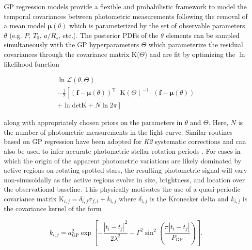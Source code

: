 GP regression models provide a flexible and probabilistic framework to model the temporal
covariances between photometric measurements following the removal of a mean model
$\boldsymbol{\mu}(\theta)$ which is parameterized by the set of observable parameters $\theta$
(e.g. $P$, $T_0$, $a/R_s$, etc.). The posterior PDFs of the $\theta$ elements 
can be sampled simultaneously with the GP hyperparameters $\Theta$ which parameterize
the residual covariances through the covariance matrix K($\Theta$) and are fit by
optimizing the $\ln$ likelihood function

\begin{multline}
  \ln{\mathcal{L}(\theta,\Theta)} = \\
  -\frac{1}{2} \left[ (\mathbf{f}-\boldsymbol{\mu}(\theta))^{\text{T}}
    \cdot \text{K}(\Theta)^{-1} \cdot (\mathbf{f}-\boldsymbol{\mu}(\theta)) \right. \\
    \left. + \ln{\mathrm{det} \text{K}} + N \ln{2 \pi} \right] \label{eq:lnL}
\end{multline}

\noindent along with appropriately chosen priors on the parameters in $\theta$ and $\Theta$.
Here, $N$ is the number of photometric measurements in the light curve. Similar routines based on GP regression 
have been adopted for \emph{K2} systematic corrections \citep[e.g.][]{aigrain15,crossfield15,aigrain16} 
and can also be used to infer accurate photometric stellar rotation periods \citep{angus18}. For cases in which
the origin of the apparent photometric variations are likely dominated by active regions on rotating spotted
stars, the resulting photometric signal will vary non-sinusoidally as the active regions 
evolve in size, brightness, and location over the observational baseline. This physically motivates the
use of a quasi-periodic covariance matrix K$_{i,j} = \delta_{i,j} \sigma_{f,i} + k_{i,j}$ where $\delta_{i,j}$
is the Kronecker delta and $k_{i,j}$ is the covariance kernel of the form

\begin{equation}
  k_{i,j} = a_{\text{GP}}^2 \exp{\left[ - \frac{|t_i-t_j|^2}{2\lambda^2} -\Gamma^2
      \sin^2{\left(\frac{\pi|t_i-t_j|}{P_{\text{GP}}} \right)} \right]}.
\end{equation}

